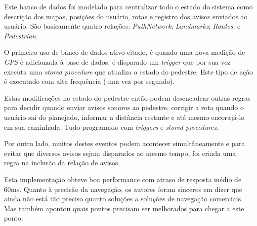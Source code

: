 \documentclass[conference]{IEEEtran}
\begin{document}
    Este banco de dados foi modelado para centralizar todo o estado do sistema como descrição dos mapas, posições do usuário, rotas e registro dos avisos enviados ao usuário. São basicamente quatro relações: \textit{PathNetwork}; \textit{Landmarks}; \textit{Routes}; e \textit{Pedestrian}.

    O primeiro uso de banco de dados ativo citado, é quando uma nova medição de \textit{GPS} é adicionada à base de dados, é disparado um \textit{trigger} que por sua vez executa uma \textit{stored procedure} que atualiza o estado do pedestre. Este tipo de ação é executado com alta frequência (uma vez por segundo).

    Estas modificações no estado do pedestre então podem desencadear outras regras para decidir quando enviar avisos sonoros ao pedestre, corrigir a rota quando o usuário sai do planejado, informar a distância restante e até mesmo encorajá-lo em sua caminhada. Tudo programado com \textit{triggers} e \textit{stored procedures}.

    Por outro lado, muitos destes eventos podem acontecer simultâneamente e para evitar que diversos avisos sejam disparados ao mesmo tempo, foi criada uma regra na inclusão da relação de avisos.

    Esta implementação obteve boa performance com atraso de resposta médio de 60ms. Quanto à precisão da navegação, os autores foram sinceros em dizer que ainda não está tão preciso quanto soluções a soluções de navegação comerciais. Mas também apontou quais pontos precisam ser melhorados para chegar a este ponto.
\end{document}
